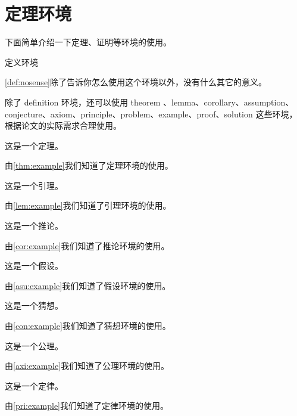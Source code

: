 
\section{定理环境}

下面简单介绍一下定理、证明等环境的使用。
\begin{definition}
    定义环境
    \label{def:nosense}
\end{definition}
\cref{def:nosense}除了告诉你怎么使用这个环境以外，没有什么其它的意义。

除了 definition 环境，还可以使用 theorem 、lemma、corollary、assumption、conjecture、axiom、principle、problem、example、proof、solution 这些环境，根据论文的实际需求合理使用。

\begin{theorem}
    这是一个定理。
    \label{thm:example}
\end{theorem}
由\cref{thm:example}我们知道了定理环境的使用。

\begin{lemma}
    这是一个引理。
    \label{lem:example}
\end{lemma}
由\cref{lem:example}我们知道了引理环境的使用。

\begin{corollary}
    这是一个推论。
    \label{cor:example}
\end{corollary}
由\cref{cor:example}我们知道了推论环境的使用。

\begin{assumption}
    这是一个假设。
    \label{asu:example}
\end{assumption}
由\cref{asu:example}我们知道了假设环境的使用。

\begin{conjecture}
    这是一个猜想。
    \label{con:example}
\end{conjecture}
由\cref{con:example}我们知道了猜想环境的使用。

\begin{axiom}
    这是一个公理。
    \label{axi:example}
\end{axiom}
由\cref{axi:example}我们知道了公理环境的使用。

\begin{principle}
    这是一个定律。
    \label{pri:example}
\end{principle}
由\cref{pri:example}我们知道了定律环境的使用。

